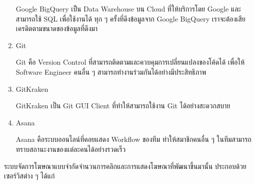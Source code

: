 \begin{enumerate}
	Google BigQuery เป็น Data Warehouse บน Cloud ที่ให้บริการโดย Google และสามารถใช้ SQL เพื่อใช้งานได้ ทุก ๆ ครั้งที่ดึงข้อมูลจาก Google BigQuery เราจะต้องเสียเครดิตตามขนาดของข้อมูลที่ดึงมา
	
	\item Git
	
	Git คือ Version Control ที่สามารถติดตามและควบคุมการเปลี่ยนแปลงของโค้ดได้ เพื่อให้ Software Engineer คนอื่น ๆ สามารถทำงานร่วมกันได้อย่างมีประสิทธิภาพ
	
	\item GitKraken
	
	GitKraken เป็น Git GUI Client ที่ทำให้สามารถใช้งาน Git ได้อย่างสะดวกสบาย
	
	\item Asana
	
	Asana คือระบบออนไลน์ที่คอยแสดง Workflow ของทีม ทำให้สมาชิกคนอื่น ๆ ในทีมสามารถทราบสถานะงานของแต่ละคนได้อย่างรวดเร็ว
\end{enumerate}

ระบบจัดการโฆษณาแบบจำกัดจำนวนการคลิกและการแสดงโฆษณาที่พัฒนาขึ้นมานั้น ประกอบด้วยเซอร์วิสต่าง ๆ ได้แก่

